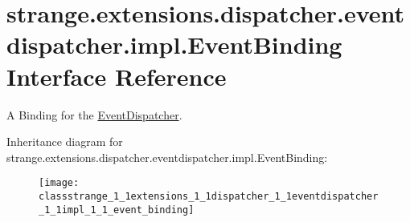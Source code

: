 \hypertarget{classstrange_1_1extensions_1_1dispatcher_1_1eventdispatcher_1_1impl_1_1_event_binding}{\section{strange.\-extensions.\-dispatcher.\-eventdispatcher.\-impl.\-Event\-Binding Interface Reference}
\label{classstrange_1_1extensions_1_1dispatcher_1_1eventdispatcher_1_1impl_1_1_event_binding}
}


A Binding for the \hyperlink{classstrange_1_1extensions_1_1dispatcher_1_1eventdispatcher_1_1impl_1_1_event_dispatcher}{Event\-Dispatcher}.  


Inheritance diagram for strange.\-extensions.\-dispatcher.\-eventdispatcher.\-impl.\-Event\-Binding\-:\begin{figure}[H]
\begin{center}
\leavevmode
\texttt{[image: classstrange\_1\_1extensions\_1\_1dispatcher\_1\_1eventdispatcher\_1\_1impl\_1\_1\_event\_binding]}
\end{center}
\end{figure}
